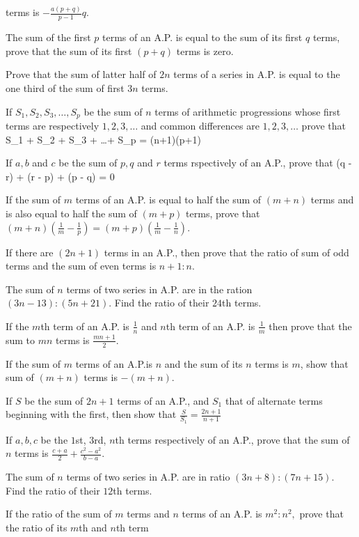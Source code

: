   terms is $-\frac{a(p + q)}{p - 1}q$.
\item The sum of the first $p$ terms of an A.P. is equal to the sum of its first $q$ terms, prove that the sum of its first $(p +
  q)$ terms is zero.
\item Prove that the sum of latter half of $2n$ terms of a series in A.P. is equal to the one third of the sum of first $3n$ terms.
\item If $S_1, S_2, S_3, \ldots, S_p$ be the sum of $n$ terms of arithmetic progressions whose first terms are respectively $1, 2,
  3, \ldots$ and common differences are $1, 2, 3, \ldots$ prove that \startformula S_1 + S_2 + S_3 + \ldots + S_p = (n+1)(p+1)\stopformula
\item If $a,b$ and $c$ be the sum of $p, q$ and $r$ terms rspectively of an A.P., prove that \startformula {}(q - r) + (r -
  p) + (p - q) = 0\stopformula
\item If the sum of $m$ terms of an A.P. is equal to half the sum of $(m + n)$ terms and is also equal to half the sum of $(m + p)$
  terms, prove that $(m + n)\left(\frac{1}{m} - \frac{1}{p}\right) = (m + p)\left(\frac{1}{m} - \frac{1}{n}\right)$.
\item If there are $(2n + 1)$ terms in an A.P., then prove that the ratio of sum of odd terms and the sum of even terms is $n + 1:
  n$.
\item The sum of $n$ terms of two series in A.P. are in the ration $(3n - 13): (5n + 21)$. Find the ratio of their $24$th terms.
\item If the $m$th term of an A.P. is $\frac{1}{n}$ and $n$th term of an A.P. is $\frac{1}{m}$ then prove that the sum to $mn$
  terms is $\frac{mn + 1}{2}$.
\item If the sum of $m$ terms of an A.P.is $n$ and the sum of its $n$ terms is $m$, show that sum of $(m + n)$ terms is $-(m + n)$.
\item If $S$ be the sum of $2n + 1$ terms of an A.P., and $S_1$ that of alternate terms beginning with the first, then show that
  $\frac{S}{S_1} = \frac{2n + 1}{n + 1}$
\item If $a, b, c$ be the $1$st, $3$rd, $n$th terms respectively of an A.P., prove that the sum of $n$ terms is $\frac{c + a}{2} +
  \frac{c^2 - a^2}{b - a}$.
\item The sum of $n$ terms of two series in A.P. are in ratio $(3n + 8):(7n + 15)$. Find the ratio of their $12$th terms.
\item If the ratio of the sum of $m$ terms and $n$ terms of an A.P. is $m^2:n^2,$ prove that the ratio of its $m$th and $n$th term

